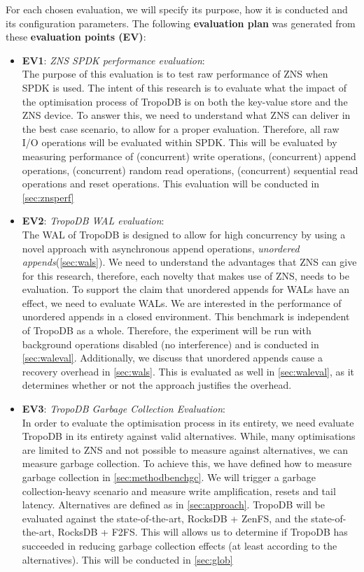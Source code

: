 For each chosen evaluation, we will specify its purpose, how it is conducted and its configuration parameters. The following \textbf{evaluation plan}  was generated from these \textbf{evaluation points (EV)}:
\begin{itemize}
    \item \textbf{EV1}: \textit{ZNS SPDK performance evaluation}:\\
    The purpose of this evaluation is to test raw performance of ZNS when SPDK is used. The intent of this research is to evaluate what the impact of the optimisation process of TropoDB is on both the key-value store and the ZNS device. To answer this, we need to understand what ZNS can deliver in the best case scenario, to allow for a proper evaluation. Therefore, all raw I/O operations will be evaluated within SPDK. This will be evaluated by measuring performance of (concurrent) write operations, (concurrent) append operations, (concurrent) random read operations, (concurrent) sequential read operations and reset operations. This evaluation will be conducted in  \autoref{sec:znsperf}
    \item \textbf{EV2}: \textit{TropoDB WAL evaluation}:\\
    The WAL of TropoDB is designed to allow for high concurrency by using a novel approach with asynchronous append operations, \textit{unordered appends}(\autoref{sec:wals}). We need to understand the advantages that ZNS can give for this research, therefore, each novelty that makes use of ZNS, needs to be evaluation. To support the claim that unordered appends for WALs have an effect, we need to evaluate WALs. We are interested in the performance of unordered appends in a closed environment. This benchmark is independent of TropoDB as a whole. Therefore, the experiment will be run with background operations disabled (no interference) and is conducted in \autoref{sec:waleval}. Additionally, we discuss that unordered appends cause a recovery overhead in \autoref{sec:wals}. This is evaluated as well in \autoref{sec:waleval}, as it determines whether or not the approach justifies the overhead.
    \item \textbf{EV3}: \textit{TropoDB Garbage Collection Evaluation}:\\
    In order to evaluate the optimisation process in its entirety, we need evaluate TropoDB in its entirety against valid alternatives. While, many optimisations are limited to ZNS and not possible to measure against alternatives, we can measure garbage collection. To achieve this, we have defined how to measure garbage collection in \autoref{sec:methodbenchgc}. We will trigger a garbage collection-heavy scenario and measure write amplification, resets and tail latency. Alternatives are defined as in \autoref{sec:approach}. TropoDB will be evaluated against the state-of-the-art, RocksDB + ZenFS, and the state-of-the-art, RocksDB + F2FS. This will allows us to determine if TropoDB has succeeded in reducing garbage collection effects (at least according to the alternatives). This will be conducted in \autoref{sec:glob}

\end{itemize}
